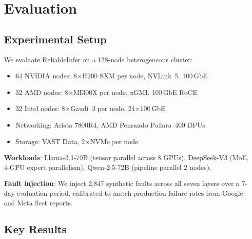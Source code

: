 \documentclass[conference,10pt,letterpaper]{IEEEtran}
\begin{document}
\section{Evaluation}
\label{sec:eval}

\subsection{Experimental Setup}

We evaluate ReliableInfer on a 128-node heterogeneous cluster:
\begin{itemize}
\item 64 NVIDIA nodes: 8$\times$H200 SXM per node, NVLink~5, 100\,GbE
\item 32 AMD nodes: 8$\times$MI300X per node, xGMI, 100\,GbE RoCE
\item 32 Intel nodes: 8$\times$Gaudi~3 per node, 24$\times$100\,GbE
\item Networking: Arista 7800R4, AMD Pensando Pollara~400 DPUs
\item Storage: VAST Data, 2$\times$NVMe per node
\end{itemize}

\textbf{Workloads}: Llama-3.1-70B (tensor parallel across 8 GPUs), DeepSeek-V3 (MoE, 4-GPU expert parallelism), Qwen-2.5-72B (pipeline parallel 2 nodes).

\textbf{Fault injection}: We inject 2,847 synthetic faults across all seven layers over a 7-day evaluation period, calibrated to match production failure rates from Google and Meta fleet reports.

\subsection{Key Results}

\begin{table}[!t]
\caption{Availability and Recovery Results}
\label{tab:results}
\centering\scriptsize
{}
\end{table}
\end{document}
